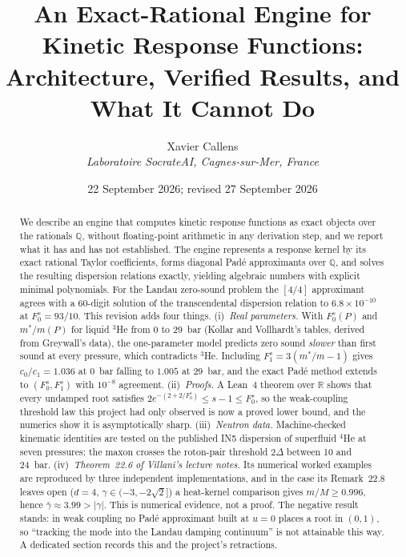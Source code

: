 \documentclass[11pt,a4paper]{article}
\title{\textbf{An Exact-Rational Engine for Kinetic Response Functions:\\
Architecture, Verified Results, and What It Cannot Do}}
\author{Xavier Callens\\
\textit{Laboratoire SocrateAI, Cagnes-sur-Mer, France}}
\date{22 September 2026; revised 27 September 2026}
\newcommand{\Fzs}{F_0^{s}}
\newcommand{\Fos}{F_1^{s}}
\begin{document}
\sloppy

\maketitle

\begin{abstract}
We describe an engine that computes kinetic response functions as exact objects
over the rationals $\mathbb{Q}$, without floating-point arithmetic in any
derivation step, and we report what it has and has not established. The engine
represents a response kernel by its exact rational Taylor coefficients, forms
diagonal Pad\'e approximants over $\mathbb{Q}$, and solves the resulting
dispersion relations exactly, yielding algebraic numbers with explicit minimal
polynomials. For the Landau zero-sound problem the $[4/4]$ approximant agrees
with a $60$-digit solution of the transcendental dispersion relation to
$6.8\times10^{-10}$ at $\Fzs=93/10$.
This revision adds four things.
(i)~\emph{Real parameters.} With $\Fzs(P)$ and $m^*/m(P)$ for liquid $^3$He
from 0 to 29~bar (Kollar and Vollhardt's tables, derived from Greywall's
data), the one-parameter model predicts zero sound \emph{slower} than first
sound at every pressure, which contradicts $^3$He. Including $\Fos=3(m^*/m-1)$
gives $c_0/c_1=1.036$ at 0~bar falling to $1.005$ at 29~bar, and the exact
Pad\'e method extends to $(\Fzs,\Fos)$ with $10^{-8}$ agreement.
(ii)~\emph{Proofs.} A Lean~4 theorem over $\mathbb{R}$ shows that every undamped
root satisfies $2e^{-(2+2/\Fzs)}\le s-1\le\Fzs$, so the weak-coupling threshold
law this project had only observed is now a proved lower bound, and the numerics
show it is asymptotically sharp.
(iii)~\emph{Neutron data.} Machine-checked kinematic identities are tested on
the published IN5 dispersion of superfluid $^4$He at seven pressures: the
maxon crosses the roton-pair threshold $2\Delta$ between 10 and 24~bar.
(iv)~\emph{Theorem~22.6 of Villani's lecture notes.} Its numerical worked
examples are reproduced by three independent implementations, and in the case
its Remark~22.8 leaves open ($d=4$, $\gamma\in(-3,-2\sqrt2]$) a heat-kernel
comparison gives $m/M\ge0.996$, hence $\bar\gamma\approx3.99>|\gamma|$.
This is numerical evidence, not a proof.
The negative result stands: in weak coupling no Pad\'e approximant built at
$u=0$ places a root in $(0,1)$, so ``tracking the mode into the Landau damping
continuum'' is not attainable this way. A dedicated section records this and
the project's retractions.
\end{abstract}
\end{document}
